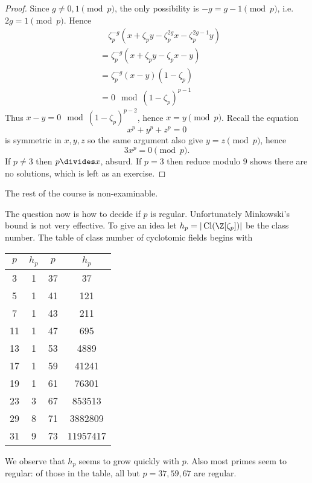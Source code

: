 \documentclass[a4paper]{article}
\DeclareMathOperator{\Cl}{Cl} %
\begin{document}
\begin{proof}
  Since \(g \neq 0, 1 \pmod p\), the only possibility is \(-g = g - 1 \pmod p\), i.e.\  \(2g = 1 \pmod p\). Hence
  \begin{align*}
    & \quad \zeta_p^{-g}(x + \zeta_p y - \zeta_p^{2g} x - \zeta_p^{2g - 1} y) \\
    &= \zeta_p^{-g} (x + \zeta_p y - \zeta_p x - y) \\
    &= \zeta_p^{-g} (x - y) (1 - \zeta_p) \\
    &= 0 \mod{(1 - \zeta_p)^{p - 1}}
  \end{align*}
  Thus \(x - y = 0 \mod{(1 - \zeta_p)^{p - 2}}\), hence \(x = y \pmod p\). Recall the equation
  \[
    x^p + y^p + z^p = 0
  \]
  is symmetric in \(x, y, z\) so the same argument also give \(y = z \pmod p\), hence
  \[
    3x^p = 0 \pmod p.
  \]
  If \(p \neq 3\) then \(p \divides x\), absurd. If \(p = 3\) then reduce modulo \(9\) shows there are no solutions, which is left as an exercise.
\end{proof}

The rest of the course is non-examinable.

The question now is how to decide if \(p\) is regular. Unfortunately Minkowski's bound is not very effective. To give an idea let \(h_p = |\Cl(\Z[\zeta_p])|\) be the class number. The table of class number of cyclotomic fields begins with
\begin{table}[ht]
  \centering
  \begin{tabular}{|c|c||c|c|}
    \(p\) & \(h_p\) & \(p\) & \(h_p\) \\ \hline
    3 & 1 & 37 & 37 \\ \hline
    5 & 1 & 41 & 121 \\ \hline
    7 & 1 & 43 & 211 \\ \hline
    11 & 1 & 47 & 695 \\ \hline
    13 & 1 & 53 & 4889 \\ \hline
    17 & 1 & 59 & 41241 \\ \hline
    19 & 1 & 61 & 76301 \\ \hline
    23 & 3 & 67 & 853513 \\ \hline
    29 & 8 & 71 & 3882809 \\ \hline
    31 & 9 & 73 & 11957417 \\
  \end{tabular}
\end{table}

We observe that \(h_p\) seems to grow quickly with \(p\). Also most primes seem to regular: of those in the table, all but \(p = 37, 59, 67\) are regular.
\end{document}
